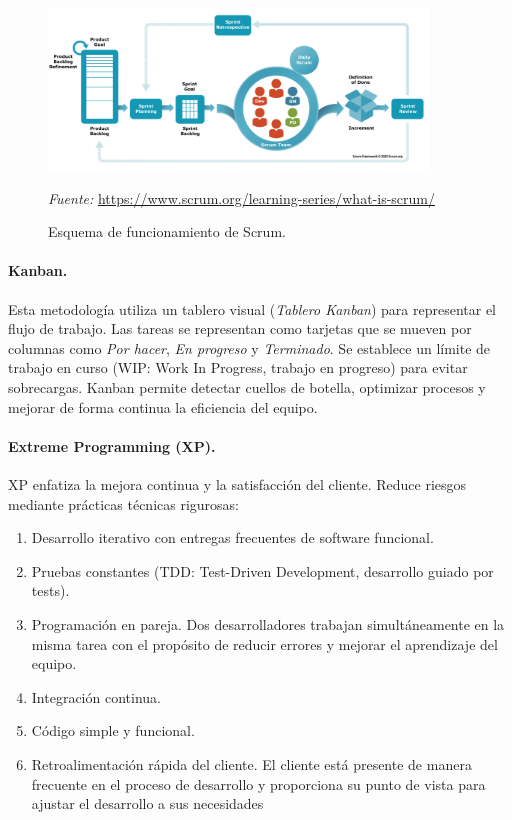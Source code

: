 \begin{figure}[H]
\centering
\includegraphics[width=0.9\textwidth]{./img/methodologies/scrum.png}
\caption{Esquema de funcionamiento de Scrum.}
\label{fig:scrum}
\vspace{0.2em}
{\footnotesize \centering \textit{Fuente:} \url{https://www.scrum.org/learning-series/what-is-scrum/} \par}
\end{figure}

\paragraph{Kanban.} Esta metodología utiliza un tablero visual (\textit{Tablero Kanban}) para representar el flujo de trabajo. Las tareas se representan como tarjetas que se mueven por columnas como \textit{Por hacer}, \textit{En progreso} y \textit{Terminado}. Se establece un límite de trabajo en curso (WIP: Work In Progress, trabajo en progreso) para evitar sobrecargas. Kanban permite detectar cuellos de botella, optimizar procesos y mejorar de forma continua la eficiencia del equipo.

\paragraph{Extreme Programming (XP).} XP enfatiza la mejora continua y la satisfacción del cliente. Reduce riesgos mediante prácticas técnicas rigurosas:

\begin{enumerate}
    \item Desarrollo iterativo con entregas frecuentes de software funcional.
    \item Pruebas constantes (TDD: Test-Driven Development, desarrollo guiado por tests).
    \item Programación en pareja. Dos desarrolladores trabajan simultáneamente en la misma tarea con el propósito de reducir errores y mejorar el aprendizaje del equipo.
    \item Integración continua.
    \item Código simple y funcional.
    \item Retroalimentación rápida del cliente. El cliente está presente de manera frecuente en el proceso de desarrollo y proporciona su punto de vista para ajustar el desarrollo a sus necesidades
\end{enumerate}


